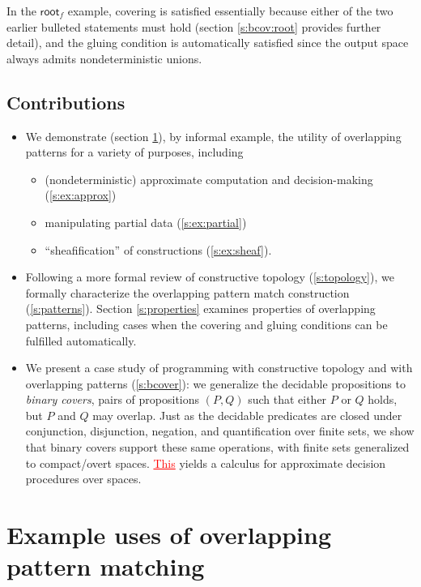 \documentclass[conference]{IEEEtran}
\newcommand{\grammar}[1]{\textcolor{red}{\underline{#1}}}
\begin{document}
In the $\mathsf{root}_f$ example, covering is satisfied essentially because either of the two earlier bulleted statements must hold (section \ref{s:bcov:root} provides further detail), and the gluing condition is automatically satisfied since the output space always admits nondeterministic unions.


\subsection{Contributions}
\begin{itemize}
\item
We demonstrate (section \ref{s:examples}), by informal example, the utility of overlapping patterns for a variety of purposes, including
\begin{itemize}
\item (nondeterministic) approximate computation and decision-making (\ref{s:ex:approx})
\item manipulating partial data (\ref{s:ex:partial})
\item ``sheafification'' of constructions (\ref{s:ex:sheaf}).
\end{itemize}

\item Following a more formal review of constructive topology (\ref{s:topology}), we formally characterize the overlapping pattern match construction (\ref{s:patterns}). Section \ref{s:properties} examines properties of overlapping patterns, including cases when the covering and gluing conditions can be fulfilled automatically. 

\item We present a case study of programming with constructive topology and with overlapping patterns (\ref{s:bcover}): we generalize the decidable propositions to \emph{binary covers}, pairs of propositions $(P, Q)$ such that either $P$ or $Q$ holds, but $P$ and $Q$ may overlap. Just as the decidable predicates are closed under conjunction, disjunction, negation, and quantification over finite sets, we show that binary covers support these same operations, with finite sets generalized to compact/overt spaces. \grammar{This} yields a calculus for approximate decision procedures over spaces.

\end{itemize}

\section{Example uses of overlapping pattern matching}
\label{s:examples}
\end{document}
